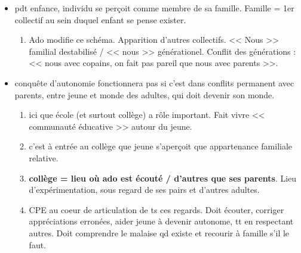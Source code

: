 \documentclass[12pt]{article}
\begin{document}
\begin{itemize}
\item pdt enfance, individu se perçoit comme membre de sa famille. Famille = 1er collectif au sein duquel enfant se pense exister.
\begin{enumerate}
\item Ado modifie ce schéma. Apparition d'autres collectifs. << Nous >> familial destabilisé / << nous >> générationel. Conflit des générations : << nous avec copains, on fait pas pareil que nous avec parents >>. \\
\end{enumerate}

\item conquête d'autonomie fonctionnera pas si c'est dans conflits permanent avec parents, entre jeune et monde des adultes, qui doit devenir son monde. \\
\begin{enumerate}
\item ici que école (et surtout collège) a rôle important. Fait vivre << communauté éducative >> autour du jeune. \\
\item c'est à entrée au collège que jeune s'aperçoit que appartenance familiale relative.\\
\item \textbf{collège = lieu où ado est écouté / d'autres que ses parents}. Lieu d'expérimentation, sous regard de ses pairs et d'autres adultes. \\
\item CPE au coeur de articulation de ts ces regards. Doit écouter, corriger appréciations erronées, aider jeune à devenir autonome, tt en respectant autres. Doit comprendre le malaise qd existe et recourir à famille s'il le faut.\\
\end{enumerate}



\end{itemize}
\end{document}
